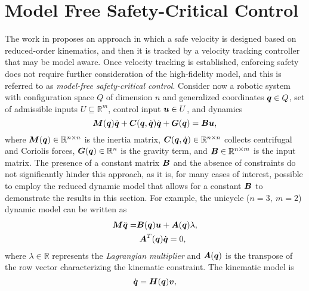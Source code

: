 \section{Model Free Safety-Critical Control}\label{sec:mfcbf}
The work in \cite{mfcbf} proposes an approach in which a safe velocity is designed based on reduced-order kinematics, and then it is tracked by a velocity tracking controller that may be model aware.
Once velocity tracking is established, enforcing safety does not require further consideration of the high-fidelity model, and this is referred to as \textit{model-free safety-critical control}.
Consider now a robotic system with configuration space $Q$
of dimension $n$ and 
generalized coordinates ${\boldsymbol{q}} \in Q$, set of admissible inputs $U\subseteq \mathbb{R}^m$, control input $\boldsymbol{u} \in U$, and dynamics
\begin{equation} \label{eq:dynamic model}
    \boldsymbol{M}({\boldsymbol{q}})\ddot{{\boldsymbol{q}}}+\boldsymbol{C}({\boldsymbol{q}},\dot{{\boldsymbol{q}}})\dot{{\boldsymbol{q}}}+\boldsymbol{G}({\boldsymbol{q}})=\boldsymbol{B}\boldsymbol{u},
\end{equation}
where $\boldsymbol{M}({\boldsymbol{q}})\in\mathbb{R}^{n \times n}$ is the inertia matrix, $\boldsymbol{C}({\boldsymbol{q}},\dot{{\boldsymbol{q}}})\in\mathbb{R}^{n \times n}$ collects centrifugal and Coriolis forces, $\boldsymbol{G}({\boldsymbol{q}}) \in\mathbb{R}^{n}$ is the gravity term, and $\boldsymbol{B}\in\mathbb{R}^{n \times m}$ is the input matrix. 
The presence of a constant matrix $\boldsymbol{B}$ and the absence of constraints do not significantly hinder this approach, as it is, for many cases of interest, possible to employ the reduced dynamic model that allows for a constant $\boldsymbol{B}$ to demonstrate the results in this section.
For example, the unicycle ($n=3,~m=2$) dynamic model can be written as 
\begin{align} \label{eq:uni_dyn}
    \boldsymbol{M}\ddot{\boldsymbol{q}} = &\boldsymbol{B}({\boldsymbol{q}}) \boldsymbol{u} + \boldsymbol{A}({\boldsymbol{q}}) \lambda, \\
    &~\boldsymbol{A}^T({\boldsymbol{q}}) \dot{\boldsymbol{q}} = 0,
\end{align}
where $\lambda \in \mathbb{R}$ represents the \textit{Lagrangian multiplier} and $\boldsymbol{A}({\boldsymbol{q}})$ is the transpose of the row vector characterizing the kinematic constraint. The kinematic model is
\begin{equation} \label{eq:dq_uni}
    \dot{{\boldsymbol{q}}} = \boldsymbol{H}({\boldsymbol{q}})\boldsymbol{v} ,
\end{equation}
